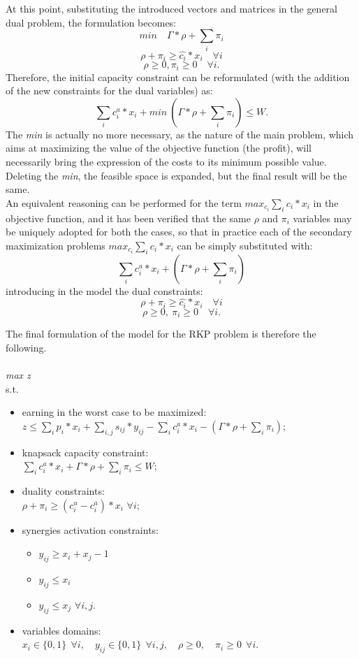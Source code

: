 \documentclass{article}
\begin{document}
At this point, substituting the introduced vectors and matrices in the general dual problem, the formulation becomes:
\[ min \quad \Gamma*\rho + \sum_i \pi_i \] \[ \rho + \pi_i \geq \hat{c_i} * x_i \quad \forall i\]\[ \rho \geq 0, \pi_i \geq 0 \quad \forall i.\]
Therefore, the initial capacity constraint can be reformulated (with the addition of the new constraints for the dual variables) as: 
\[ \sum_i c_i^a*x_i + min~(\Gamma * \rho + \sum_i \pi_i) \leq W.\] The \emph{min} is actually no more necessary, as the nature of the main problem, which aims at maximizing the value of the objective function (the profit), will necessarily bring the expression of the costs to its minimum possible value. Deleting the \emph{min}, the feasible space is expanded, but the final result will be the same.\\

An equivalent reasoning can be performed for the term $max_{c_i} \sum_i c_i*x_i$ in the objective function, and it has been verified that the same $\rho$ and $\pi_i$ variables may be uniquely adopted for both the cases, so that in practice each of the secondary maximization problems $max_{c_i} \sum_i c_i*x_i$ can be simply substituted with:
        \[
        \sum_i c_i^a * x_i + (\Gamma * \rho + \sum_i \pi_i) \]
        introducing in the model the dual constraints: 
        \[ \rho + \pi_i \geq \hat{c_i} * x_i \quad \forall i\]
        \[\rho \geq 0,~\pi_i \geq 0 \quad \forall i. \]

The final formulation of the model for the RKP problem is therefore the following.\\
\\
\emph{max z}
\\s.t.
\begin{itemize}
    \item earning in the worst case to be maximized:\\ $z \leq \sum_i p_i*x_i + \sum_{i,j} s_{ij}*y_{ij} - \sum_i c_i^a*x_i - (\Gamma*\rho + \sum_i \pi_i)$;
    \item knapsack capacity constraint:\\$\sum_i c_i^a*x_i + \Gamma*\rho + \sum_i \pi_i \leq W$;
    \item duality constraints:\\ $\rho + \pi_i \geq (c_i^u - c_i^a)*x_i $ \space\space\space$\forall i$;
    \item synergies activation constraints:
    \begin{itemize}
        \item $y_{ij} \geq x_i+x_j-1$
        \item $y_{ij} \leq x_i$
        \item $y_{ij} \leq x_j$ \space\space\space\space\space$\forall i,j$.
    \end{itemize}
   \item variables domains:\\$ x_i \in \{0,1\} ~~\forall i, \quad y_{ij} \in \{0,1\} ~~\forall i,j, \quad \rho \geq 0, \quad \pi_i \geq 0 ~~\forall i$.
\end{itemize}
\end{document}
